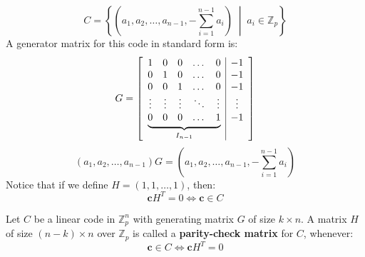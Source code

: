 \documentclass[docmute]{article}
\begin{document}
\begin{example}
$$C = \left\{ \left( a_1, a_2, \dots, a_{n-1}, -\sum_{i=1}^{n-1} a_i \right) \;\middle|\; a_i \in \mathbb{Z}_p \right\}$$
A generator matrix for this code in standard form is:
$$G = \left[
\begin{array}{c|c}
\underbrace{
\begin{matrix}
1 & 0 & 0 & \dots & 0 \\
0 & 1 & 0 & \dots & 0 \\
0 & 0 & 1 & \dots & 0 \\
\vdots & \vdots & \vdots & \ddots & \vdots \\
0 & 0 & 0 & \dots & 1
\end{matrix}
}_{I_{n-1}}
&
\begin{matrix}
-1 \\ -1 \\ -1 \\ \vdots \\ -1
\end{matrix}
\vphantom{\underbrace{\begin{matrix} 1 \\ 0 \\ 0 \\ \vdots \\ 0 \end{matrix}}_{I_{n-1}}}
\end{array}
\right]$$
$$(a_1, a_2, \dots, a_{n-1})G = (a_1, a_2, \dots, a_{n-1}, -\sum_{i=1}^{n-1} a_i)$$
Notice that if we define $H = (1, 1, \dots, 1)$, then:
$$\mathbf{c}H^T = 0 \iff \mathbf{c} \in C$$
\end{example}

\begin{definition}
Let $C$ be a linear code in $\mathbb{Z}_p^n$ with generating matrix $G$ of size $k \times n$.
A matrix $H$ of size $(n-k) \times n$ over $\mathbb{Z}_p$
is called a \textbf{parity-check matrix} for $C$, whenever:
$$\mathbf{c} \in C \iff \mathbf{c}H^T = 0$$
\end{definition}
\end{document}
